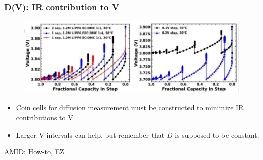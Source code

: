 \documentclass{beamer}
\begin{document}
\begin{frame}
\frametitle{D(V): IR contribution to V}

\begin{figure}
	\includegraphics[width=0.95\linewidth]{figs/IR_eg.pdf}
\end{figure}
\vspace{-0.5cm}
\begin{itemize}
	\item Coin cells for diffusion measurement must be constructed to minimize IR contributions to V.
	\item Larger V intervals can help, but remember that $D$ is supposed to be constant. 
\end{itemize}

\footnotesize AMID: How-to, EZ

\end{frame}
\end{document}

